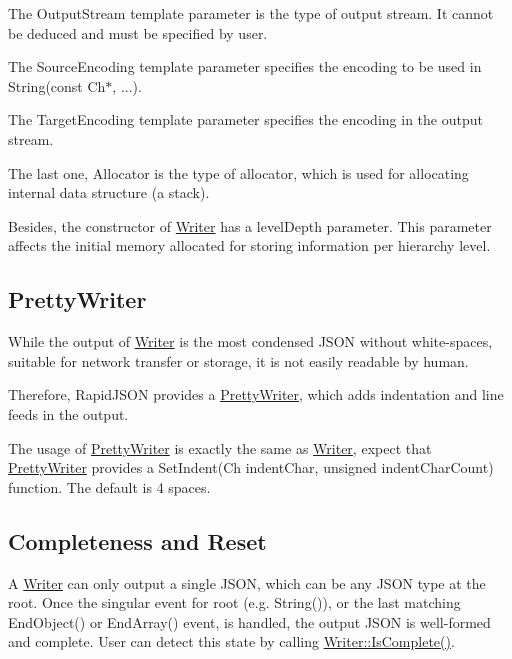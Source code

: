 The {\ttfamily Output\+Stream} template parameter is the type of output stream. It cannot be deduced and must be specified by user.

The {\ttfamily Source\+Encoding} template parameter specifies the encoding to be used in {\ttfamily String(const Ch$\ast$, ...)}.

The {\ttfamily Target\+Encoding} template parameter specifies the encoding in the output stream.

The last one, {\ttfamily Allocator} is the type of allocator, which is used for allocating internal data structure (a stack).

Besides, the constructor of {\ttfamily \hyperlink{class_writer}{Writer}} has a {\ttfamily level\+Depth} parameter. This parameter affects the initial memory allocated for storing information per hierarchy level.\hypertarget{md_Commun_Externe_RapidJSON_doc_sax.zh-cn_PrettyWriter}{}\subsection{Pretty\+Writer}\label{md_Commun_Externe_RapidJSON_doc_sax.zh-cn_PrettyWriter}
While the output of {\ttfamily \hyperlink{class_writer}{Writer}} is the most condensed J\+S\+ON without white-\/spaces, suitable for network transfer or storage, it is not easily readable by human.

Therefore, Rapid\+J\+S\+ON provides a {\ttfamily \hyperlink{class_pretty_writer}{Pretty\+Writer}}, which adds indentation and line feeds in the output.

The usage of {\ttfamily \hyperlink{class_pretty_writer}{Pretty\+Writer}} is exactly the same as {\ttfamily \hyperlink{class_writer}{Writer}}, expect that {\ttfamily \hyperlink{class_pretty_writer}{Pretty\+Writer}} provides a {\ttfamily Set\+Indent(\+Ch indent\+Char, unsigned indent\+Char\+Count)} function. The default is 4 spaces.\hypertarget{md_Commun_Externe_RapidJSON_doc_sax.zh-cn_CompletenessReset}{}\subsection{Completeness and Reset}\label{md_Commun_Externe_RapidJSON_doc_sax.zh-cn_CompletenessReset}
A {\ttfamily \hyperlink{class_writer}{Writer}} can only output a single J\+S\+ON, which can be any J\+S\+ON type at the root. Once the singular event for root (e.\+g. {\ttfamily String()}), or the last matching {\ttfamily End\+Object()} or {\ttfamily End\+Array()} event, is handled, the output J\+S\+ON is well-\/formed and complete. User can detect this state by calling {\ttfamily \hyperlink{class_writer_aced42429d1b31a565c5ca0310bf4e276}{Writer\+::\+Is\+Complete()}}.

